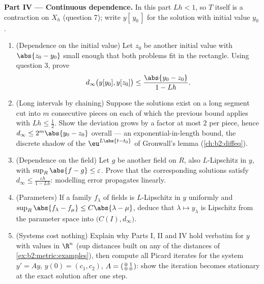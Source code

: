 \begin{problem}
\medskip
\noindent\textbf{Part IV --- Continuous dependence.} In this
part $Lh < 1$, so $T$ itself is a contraction on $X_h$ (question
7); write $y[\,y_0\,]$ for the solution with initial value
$y_0$.
\begin{enumerate}[resume]
  \item (Dependence on the initial value) Let $z_0$ be another
        initial value with $\abs{z_0 - y_0}$ small enough that
        both problems fit in the rectangle. Using question 3,
        prove
        \[
        d_\infty\bigl(y[y_0], y[z_0]\bigr) \leq
        \frac{\abs{y_0 - z_0}}{1 - Lh}.
        \]
  \item (Long intervals by chaining) Suppose the solutions exist
        on a long segment cut into $m$ consecutive pieces on
        each of which the previous bound applies with $Lh \leq
        \frac12$. Show the deviation grows by a factor at most
        $2$ per piece, hence $d_\infty \leq 2^m\abs{y_0 - z_0}$
        overall --- an exponential-in-length bound, the discrete
        shadow of the $\eu^{L\abs{t - t_0}}$ of Gronwall's lemma
        (\cref{ch:b2:diffeq}).
  \item (Dependence on the field) Let $g$ be another field on
        $R$, also $L$-Lipschitz in $y$, with $\sup_R \abs{f - g}
        \leq \varepsilon$. Prove that the corresponding
        solutions satisfy $d_\infty \leq
        \frac{\varepsilon h}{1 - Lh}$: modelling error
        propagates linearly.
  \item (Parameters) If a family $f_\lambda$ of fields is
        $L$-Lipschitz in $y$ uniformly and $\sup_R\abs{f_\lambda
        - f_\mu} \leq C\abs{\lambda - \mu}$, deduce that
        $\lambda \mapsto y_\lambda$ is Lipschitz from the
        parameter space into $\bigl(C(I), d_\infty\bigr)$.
  \item (Systems cost nothing) Explain why Parts I, II and IV
        hold verbatim for $y$ with values in $\R^n$ (sup
        distances built on any of the distances of
        \cref{ex:b2:metric:examples}), then compute all Picard
        iterates for the system $y' = Ay$, $y(0) = (c_1,
        c_2)$, $A = \begin{psmallmatrix} 0 & 1\\ 0 &
        0\end{psmallmatrix}$: show the iteration becomes
        stationary at the exact solution after one step.
\end{enumerate}


\end{problem}
